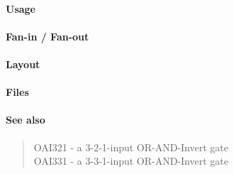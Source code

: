 \paragraph{Usage}

\paragraph{Fan-in / Fan-out}

\paragraph{Layout}

\paragraph{Files}

\paragraph{See also}
\begin{quote}
    OAI321 - a 3-2-1-input OR-AND-Invert gate \\
    OAI331 - a 3-3-1-input OR-AND-Invert gate
\end{quote}
